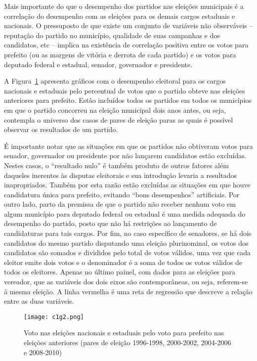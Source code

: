 Mais importante do que o desempenho dos partidos nas eleições municipais é a correlação do desempenho com as eleições para os demais cargos estaduais e nacionais. O pressuposto de que existe um conjunto de variáveis não observáveis -- reputação do partido no município, qualidade de suas campanhas e dos candidatos, etc -- implica na existência de correlação positiva entre os votos para prefeito (ou as margens de vitória e derrota de cada partido) e os votos para deputado federal e estadual, senador, governador e presidente. 

A Figura~\ref{fig:c1g2} apresenta gráficos com o desempenho eleitoral para os cargos nacionais e estaduais pelo percentual de votos que o partido obteve nas eleições anteriores para prefeito. Estão incluídos todos os partidos em todos os municípios em que o partido concorreu na eleição municipal dois anos antes, ou seja, contempla o universo dos casos de pares de eleição paras as quais é possível observar os resultados de um partido.

É importante notar que as situações em que os partidos não obtiveram votos para senador, governador ou presidente por não lançarem candidatos estão excluídas. Nestes casos, o ``resultado nulo'' é também produto de outros fatores além daqueles inerentes às disputas eleitorais e sua introdução levaria a resultados inapropriados. Também por esta razão estão excluídas as situações em que houve candidatura única para prefeito, evitando ``bons desempenhos'' artificiais. Por outro lado, parto da premissa de que o partido não receber nenhum voto em algum município para deputado federal ou estadual é uma medida adequada do desempenho do partido, posto que não há restrições ao lançamento de candidaturas para tais cargos. Por fim, no caso específico de senadores, se há dois candidatos do mesmo partido disputando uma eleição plurinominal, os votos dos candidatos são somados e divididos pelo total de votos válidos, uma vez que cada eleitor emite dois votos e o denominador é a soma de todos os votos válidos de todos os eleitores. Apenas no último painel, com dados para as eleições para vereador, que as variáveis dos dois eixos são contemporâneas, ou seja, referem-se à mesma eleição. A linha vermelha é uma reta de regressão que descreve a relação entre as duas variáveis.

\begin{figure}[htp]
	\centering
	\texttt{[image: c1g2.png]}
	\caption{Voto nas eleições nacionais e estaduais pelo voto para prefeito nas eleições anteriores (pares de eleição 1996-1998, 2000-2002, 2004-2006 e 2008-2010)}
	\label{fig:c1g2} 
\end{figure}


